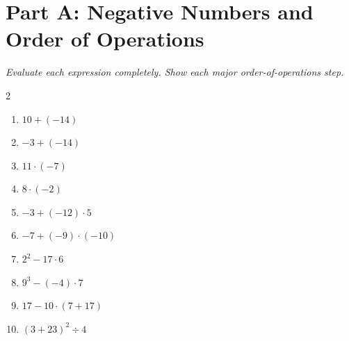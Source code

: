\documentclass[11pt]{article}
\begin{document}
\section*{Part A: Negative Numbers and Order of Operations}
\noindent\textit{Evaluate each expression completely. Show each major order-of-operations step.}
\begin{multicols}{2}
\begin{enumerate}
  \item $10 + (-14)$
  \vspace{1.1cm}
  \item $-3 + (-14)$
  \vspace{1.1cm}
  \item $11 \cdot (-7)$
  \vspace{1.1cm}
  \item $8 \cdot (-2)$
  \vspace{1.1cm}
  \item $-3 + (-12) \cdot 5$
  \vspace{1.1cm}
  \item $-7 + (-9) \cdot (-10)$
  \vspace{1.1cm}
  \item $2^{2} - 17 \cdot 6$
  \vspace{1.1cm}
  \item $9^{3} - (-4) \cdot 7$
  \vspace{1.1cm}
  \item $17 - 10 \cdot (7 + 17)$
  \vspace{1.1cm}
  \item $(3 + 23)^{2} \div 4$
  \vspace{1.1cm}
\end{enumerate}
\end{multicols}
\end{document}
